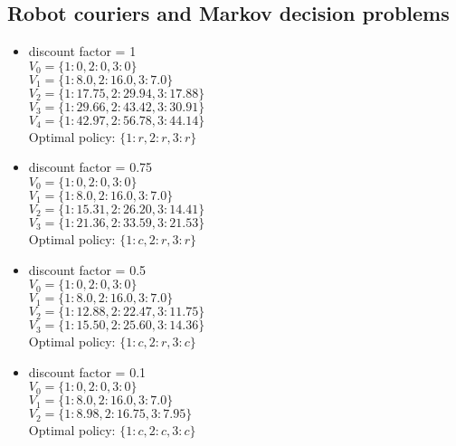 \documentclass[11pt]{article}
\begin{document}
\begin{onehalfspace}
\section{Robot couriers and Markov decision problems}
\begin{itemize}
\item
discount factor = 1 \\
$V_{0} =\{1: 0, 2: 0, 3: 0\}$ \\
$V_{1} = \{1: 8.0, 2: 16.0, 3: 7.0\}$ \\
$V_{2} = \{1: 17.75, 2: 29.94, 3: 17.88\}$ \\
$V_{3} = \{1: 29.66, 2: 43.42, 3: 30.91\}$ \\
$V_{4} = \{1: 42.97, 2: 56.78, 3: 44.14\}$ \\
Optimal policy: $\{1: r, 2: r, 3: r\}$
\item
discount factor = 0.75 \\
$V_{0} = \{1: 0, 2: 0, 3: 0\}$ \\
$V_{1} = \{1: 8.0, 2: 16.0, 3: 7.0\}$ \\
$V_{2} = \{1: 15.31, 2: 26.20, 3: 14.41\}$ \\
$V_{3} = \{1: 21.36, 2: 33.59, 3: 21.53\}$ \\
Optimal policy: $\{1: c, 2: r, 3: r\}$
\item
discount factor = 0.5 \\
$V_{0} = \{1: 0, 2: 0, 3: 0\}$ \\
$V_{1} = \{1: 8.0, 2: 16.0, 3: 7.0\}$ \\
$V_{2} = \{1: 12.88, 2: 22.47, 3: 11.75\}$ \\
$V_{3} = \{1: 15.50, 2: 25.60, 3: 14.36\}$ \\
Optimal policy: $\{1: c, 2: r, 3: c\}$
\item
discount factor = 0.1 \\
$V_{0} = \{1: 0, 2: 0, 3: 0\}$ \\
$V_{1} = \{1: 8.0, 2: 16.0, 3: 7.0\}$ \\
$V_{2} = \{1: 8.98, 2: 16.75, 3: 7.95\}$ \\
Optimal policy: $\{1: c, 2: c, 3: c\}$
\end{itemize}

\end{onehalfspace}
\end{document}
